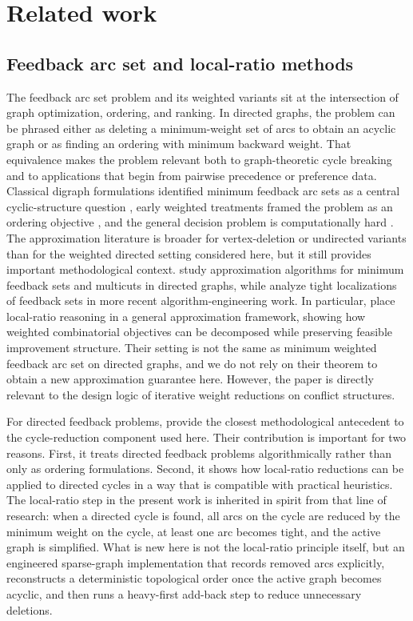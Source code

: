 \section{Related work}
\label{sec:related-work}

\subsection{Feedback arc set and local-ratio methods}

The feedback arc set problem and its weighted variants sit at the intersection of graph optimization, ordering, and ranking. In directed graphs, the problem can be phrased either as deleting a minimum-weight set of arcs to obtain an acyclic graph or as finding an ordering with minimum backward weight. That equivalence makes the problem relevant both to graph-theoretic cycle breaking and to applications that begin from pairwise precedence or preference data. Classical digraph formulations identified minimum feedback arc sets as a central cyclic-structure question \cite{LC66}, early weighted treatments framed the problem as an ordering objective \cite{F90}, and the general decision problem is computationally hard \cite{K72}. The approximation literature is broader for vertex-deletion or undirected variants than for the weighted directed setting considered here, but it still provides important methodological context. \cite{ENSS98} study approximation algorithms for minimum feedback sets and multicuts in directed graphs, while \cite{HGH21} analyze tight localizations of feedback sets in more recent algorithm-engineering work. In particular, \cite{BYGR98} place local-ratio reasoning in a general approximation framework, showing how weighted combinatorial objectives can be decomposed while preserving feasible improvement structure. Their setting is not the same as minimum weighted feedback arc set on directed graphs, and we do not rely on their theorem to obtain a new approximation guarantee here. However, the paper is directly relevant to the design logic of iterative weight reductions on conflict structures.

For directed feedback problems, \cite{DF03} provide the closest methodological antecedent to the cycle-reduction component used here. Their contribution is important for two reasons. First, it treats directed feedback problems algorithmically rather than only as ordering formulations. Second, it shows how local-ratio reductions can be applied to directed cycles in a way that is compatible with practical heuristics. The local-ratio step in the present work is inherited in spirit from that line of research: when a directed cycle is found, all arcs on the cycle are reduced by the minimum weight on the cycle, at least one arc becomes tight, and the active graph is simplified. What is new here is not the local-ratio principle itself, but an engineered sparse-graph implementation that records removed arcs explicitly, reconstructs a deterministic topological order once the active graph becomes acyclic, and then runs a heavy-first add-back step to reduce unnecessary deletions.

